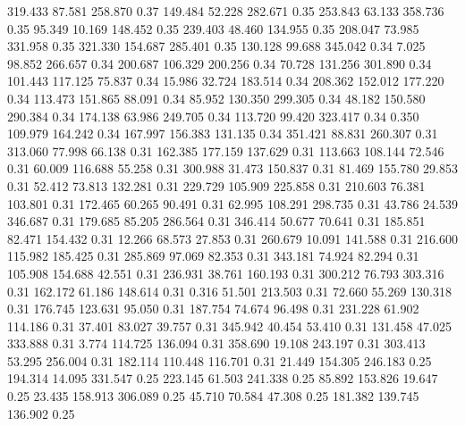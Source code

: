  319.433   87.581  258.870         0.37
 149.484   52.228  282.671         0.35
 253.843   63.133  358.736         0.35
  95.349   10.169  148.452         0.35
 239.403   48.460  134.955         0.35
 208.047   73.985  331.958         0.35
 321.330  154.687  285.401         0.35
 130.128   99.688  345.042         0.34
   7.025   98.852  266.657         0.34
 200.687  106.329  200.256         0.34
  70.728  131.256  301.890         0.34
 101.443  117.125   75.837         0.34
  15.986   32.724  183.514         0.34
 208.362  152.012  177.220         0.34
 113.473  151.865   88.091         0.34
  85.952  130.350  299.305         0.34
  48.182  150.580  290.384         0.34
 174.138   63.986  249.705         0.34
 113.720   99.420  323.417         0.34
   0.350  109.979  164.242         0.34
 167.997  156.383  131.135         0.34
 351.421   88.831  260.307         0.31
 313.060   77.998   66.138         0.31
 162.385  177.159  137.629         0.31
 113.663  108.144   72.546         0.31
  60.009  116.688   55.258         0.31
 300.988   31.473  150.837         0.31
  81.469  155.780   29.853         0.31
  52.412   73.813  132.281         0.31
 229.729  105.909  225.858         0.31
 210.603   76.381  103.801         0.31
 172.465   60.265   90.491         0.31
  62.995  108.291  298.735         0.31
  43.786   24.539  346.687         0.31
 179.685   85.205  286.564         0.31
 346.414   50.677   70.641         0.31
 185.851   82.471  154.432         0.31
  12.266   68.573   27.853         0.31
 260.679   10.091  141.588         0.31
 216.600  115.982  185.425         0.31
 285.869   97.069   82.353         0.31
 343.181   74.924   82.294         0.31
 105.908  154.688   42.551         0.31
 236.931   38.761  160.193         0.31
 300.212   76.793  303.316         0.31
 162.172   61.186  148.614         0.31
   0.316   51.501  213.503         0.31
  72.660   55.269  130.318         0.31
 176.745  123.631   95.050         0.31
 187.754   74.674   96.498         0.31
 231.228   61.902  114.186         0.31
  37.401   83.027   39.757         0.31
 345.942   40.454   53.410         0.31
 131.458   47.025  333.888         0.31
   3.774  114.725  136.094         0.31
 358.690   19.108  243.197         0.31
 303.413   53.295  256.004         0.31
 182.114  110.448  116.701         0.31
  21.449  154.305  246.183         0.25
 194.314   14.095  331.547         0.25
 223.145   61.503  241.338         0.25
  85.892  153.826   19.647         0.25
  23.435  158.913  306.089         0.25
  45.710   70.584   47.308         0.25
 181.382  139.745  136.902         0.25
